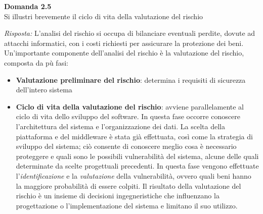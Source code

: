 \documentclass{article}
\newenvironment{problem}[2][Domanda]
    { \begin{mdframed}[backgroundcolor=gray!20] \textbf{#1 #2} \\}
    {  \end{mdframed}}
\newenvironment{solution}
    {\textit{Risposta:}}
    {}
\begin{document}
\begin{problem}{2.5}
Si illustri brevemente il ciclo di vita della valutazione del rischio
\end{problem}
\begin{solution}
L'analisi del rischio si occupa di bilanciare eventuali perdite, dovute ad attacchi informatici, con i costi richiesti per assicurare la protezione dei beni.
\newline
Un'importante componente dell'analisi del rischio è la valutazione del rischio, composta da pù fasi:
\begin{itemize}
	\item \textbf{Valutazione preliminare del rischio}: determina i requisiti di sicurezza dell'intero sistema
	\item \textbf{Ciclo di vita della valutazione del rischio}: avviene parallelamente al ciclo di vita dello sviluppo del software.
	\newline
	In questa fase occorre conoscere l'architettura del sistema e l'organizzazione dei dati.
	\newline
	La scelta della piattaforma e del middleware è stata già effettuata, così come la strategia di sviluppo del sistema; ciò consente di conoscere meglio cosa è necessario proteggere e quali sono le possibili vulnerabilità del sistema, alcune delle quali determinate da scelte progettuali precedenti.
	\newline
	In questa fase vengono effettuate l'\textit{identificazione} e la \textit{valutazione} della vulnerabilità, ovvero quali beni hanno la maggiore probabilità di essere colpiti.
	\newline
	Il risultato della valutazione del rischio è un insieme di decisioni ingegneristiche che influenzano la progettazione o l'implementazione del sistema e limitano il suo utilizzo.
\end{itemize}
\end{solution}
\end{document}
